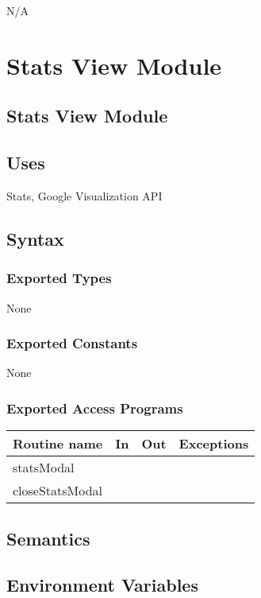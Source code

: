 \documentclass[12pt]{article}
\begin{document}
N/A

\newpage

\section {Stats View Module}

\subsection* {Stats View Module}

\subsection* {Uses}

Stats, Google Visualization API

\subsection* {Syntax}

\subsubsection* {Exported Types}

None

\subsubsection* {Exported Constants}

None

\subsubsection* {Exported Access Programs}

\begin{tabular}{| l | l | l | p{6cm} |}
\hline
\textbf{Routine name} & \textbf{In} & \textbf{Out} & \textbf{Exceptions}\\
\hline
statsModal & ~ & ~ &  \\
\hline
closeStatsModal & ~ & ~ & \\
\hline
\end{tabular}

\subsection* {Semantics}

\subsection*{Environment Variables}
\end{document}
